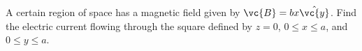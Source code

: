 A certain region of space has a magnetic field given by $\vc{B}=bx\hat{\vc{y}}$.
Find the electric current flowing through the square defined by $z=0$,
$0\le x \le a$, and $0\le y \le a$.\answercheck
